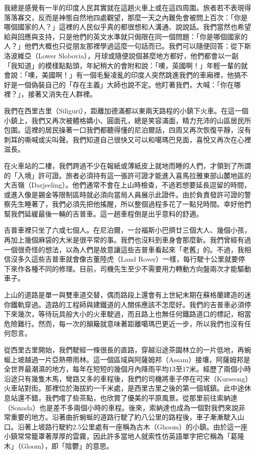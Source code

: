 我總是感覺有一半的印度人民其實就在這趟火車上或在這四周圍。旅者若不表現得落落寡交，反而是神態自然地四處觀望，那麼一天之內難免會被問上百次：「你是哪個國家的人？」這裡的人民似乎真的都很想和人溝通、說說話。我們當然也希望給與回應與支持，只是他們的英文水準就只侷限在同一個問題：「你是哪個國家的人？」他們大概也只從朋友那裡學過這麼一句話而已。我們可以隨便回答：從下斯洛波維亞（Lower
Slobovia），月球或隨便說個甚麼地方都好，他們都會以一副「我知道」的模樣點點頭，年紀稍大的會附和說：「噢，英國啊！」年輕一輩的就會說：「噢，美國啊！」有一個毛髮凌亂的印度人突然跳進我們的車廂裡，他搞不好是一個偽裝自己的「存在主義」大師也說不定。他盯著我們，大喊：「你在哪裡？」，接著又消失在人群裡。

我們在西里古里（Siliguri），距離加德滿都以東兩天路程的小鎮下火車。在這一個小鎮上，我們又再次被體格嬌小、圓面孔，總是笑容滿面，精力充沛的山區居民所包圍。這裡的居民操著一口我們都聽得懂的尼泊爾話，四周又再次恢復平靜，沒有刺耳的嘶喊或尖叫聲。我們知道自己很快又可以和噶瑪巴見面，喜悅又再次在心裡滋長。

在火車站的二樓，我們跨過不少在報紙或薄紙皮上就地而睡的人們，才領到了所謂的「入境」許可證。旅者必須持有這一張許可證才能進入喜馬拉雅東部山麓地區的大吉嶺（Darjeeling）。他們通常不會在上山時檢查，不過若想要延長逗留的時間，或進入像是錫金等限制區時就必須向當局人員展示此證件。由於負責發許可證的警察先生睡著了，我們必須先把他搖醒，所以整個過程多花了一點兒時間。幸好他們幫我們延緩最後一輛的吉普車。這一趟車程倒是出乎意料的舒適。

吉普車裡只坐了六或七個人。在尼泊爾，一台福斯小巴擠廿三個大人、幾個小孩，再加上幾個麻袋的大米是很平常的事。我們也沒料到車身會那麼新。我們曾經有過一個很奇怪的想法，以為人們是故意讓這些吉普車看起來「老舊」的。不過，我相信沒多久這些吉普車就會像古董陸虎（Land
Rover）一樣，每行駛十公里就要停下來作各種不同的修理。目前，司機先生至少不需要用力轉動方向盤兩次才能驅動車子。

上山的道路是單一與雙車道交替，偶而路段上還會有上世紀末期在蘇格蘭建造的迷你鐵軌穿過。造路的工程師與建鐵道的人關係應該不怎麼好。我們的吉普車必須停下來幾次，等待玩具般大小的火車駛過，而且路上也無任何鐵路道口的標記，相當危險難行。然而，每一次的顛簸就意味著距離噶瑪巴更近一步，所以我們也沒有任何怨言。

從西里古里開始，我們駛經一條很長的直路，穿越沿途茶園林立的一片低地，再蜿蜒上坡越過一片亞熱帶雨林。這一個區域與阿薩姆邦（Assam）接壤，阿薩姆邦是全世界最潮濕的地方，每年在短短的幾個月內降雨平均13至17米。經歷了兩個小時沿途只有幾隻木馬，彎路又多的車程後，我們的司機將車子停在可宋（Kurseong）火車站對街。那裡位於海拔約一千米處，是西里古里之後的第一個城鎮。此中途休息站還不錯，我們嚐了些茶點，也欣賞了優美的平原風景。從那里前往索納達（Sonada）也是差不多兩個小時的車程。後來，索納達也成為一個對我們來說非常重要的地方。沿著曲折蜿蜒的道路行駛了約八公里的路程後，車子漸漸駛入山口。沿著上坡路行駛約2.5公里處有一座稱為古木（Ghoom）的小鎮。由於這一座小鎮常常籠罩著厚厚的雲霧，因此許多當地人就索性仿英語單字把它稱為「葛隆木」（Gloom），即「陰鬱」的意思。

